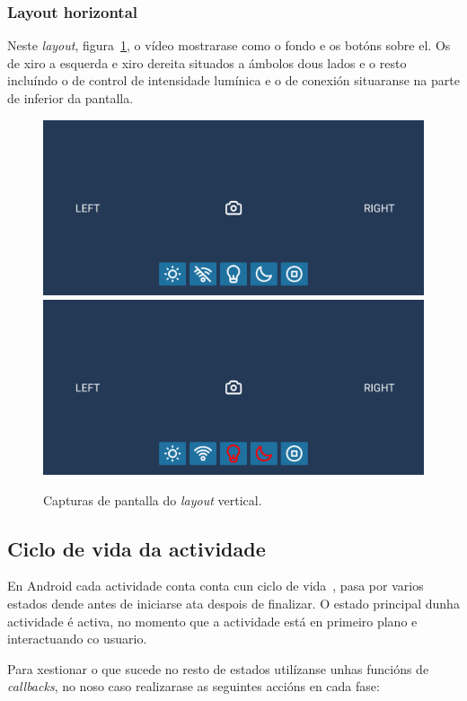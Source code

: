 \subsubsection{Layout horizontal}
Neste \emph{layout}, figura~\ref{fig:layout_vertical}, o vídeo mostrarase como o fondo e os botóns sobre el. Os de xiro a esquerda e xiro dereita situados a ámbolos dous lados e o resto incluíndo o de control de intensidade lumínica e o de conexión situaranse na parte de inferior da pantalla.
\begin{figure}[tbp]
  \centering
  \includegraphics[scale=.1]{imaxes/layout-horizontal1.png}
  \includegraphics[scale=.1]{imaxes/layout-horizontal2.png}
  \caption{Capturas de pantalla do \emph{layout} vertical.}
  \label{fig:layout_vertical}
\end{figure}
\subsection{Ciclo de vida da actividade}
En Android cada actividade conta conta cun ciclo de vida~\cite{UnderstandActivityLifecyclea}, pasa por varios estados dende antes de iniciarse ata despois de finalizar. O estado principal dunha actividade é activa, no momento que a actividade está en primeiro plano e interactuando co usuario.

Para xestionar o que sucede no resto de estados utilízanse unhas funcións de \emph{callbacks}, no noso caso realizarase as seguintes accións en cada fase:
